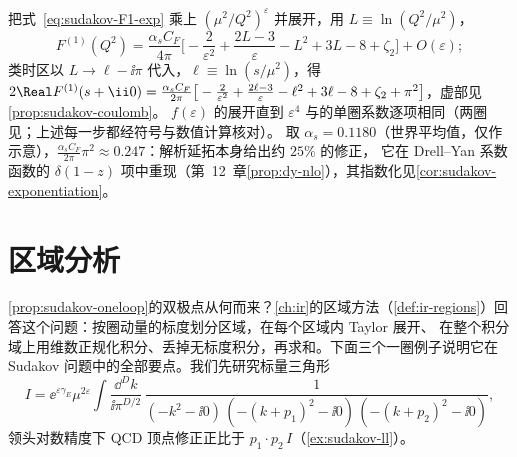 把式~\eqref{eq:sudakov-F1-exp} 乘上 $(\mu^2/Q^2)^\varepsilon$ 并展开，用 $L\equiv\ln(Q^2/\mu^2)$，
\begin{equation}\label{eq:sudakov-F1-L}
F^{(1)}(Q^2)=\frac{\alpha_sC_F}{4\pi}\Big[-\frac2{\varepsilon^2}+\frac{2L-3}{\varepsilon}-L^2+3L-8+\zeta_2\Big]+O(\varepsilon);
\end{equation}
类时区以 $L\to\ell-\ii\pi$ 代入，$\ell\equiv\ln(s/\mu^2)$，得
$2\Real F^{(1)}(s+\ii0)=\frac{\alpha_sC_F}{2\pi}\big[-\frac2{\varepsilon^2}+\frac{2\ell-3}{\varepsilon}-\ell^2+3\ell-8+\zeta_2+\pi^2\big]$，虚部见\cref{prop:sudakov-coulomb}。
$f(\varepsilon)$ 的展开直到 $\varepsilon^4$ 与\cite[式~(3.5)]{MochVermaserenVogt2005}的单圈系数逐项相同（两圈见\cite{Gonsalves1983}；上述每一步都经符号与数值计算核对）。%
取 $\alpha_s=0.1180$（世界平均值\cite{ParticleDataGroup:2024cfk}，仅作示意），$\frac{\alpha_sC_F}{2\pi}\pi^2\approx0.247$：解析延拓本身给出约 $25\%$ 的修正，
它在 Drell--Yan 系数函数的 $\delta(1-z)$ 项中重现（第~12~章\cref{prop:dy-nlo}），其指数化见\cref{cor:sudakov-exponentiation}。
\section{区域分析}\label{sec:sudakov-regions}

\cref{prop:sudakov-oneloop}的双极点从何而来？\cref{ch:ir}的区域方法（\cref{def:ir-regions}）回答这个问题：按圈动量的标度划分区域，在每个区域内 Taylor 展开、
在整个积分域上用维数正规化积分、丢掉无标度积分，再求和。下面三个一圈例子说明它在 Sudakov 问题中的全部要点。我们先研究标量三角形
\begin{equation}\label{eq:sudakov-triangle}
I=\ee^{\varepsilon\gamma_E}\mu^{2\varepsilon}\int\!\frac{\dd^Dk}{\ii\pi^{D/2}}\,
\frac{1}{(-k^2-\ii0)\,(-(k+p_1)^2-\ii0)\,(-(k+p_2)^2-\ii0)},
\end{equation}
领头对数精度下 QCD 顶点修正正比于 $p_1\cdot p_2\,I$（\cref{ex:sudakov-ll}）。

